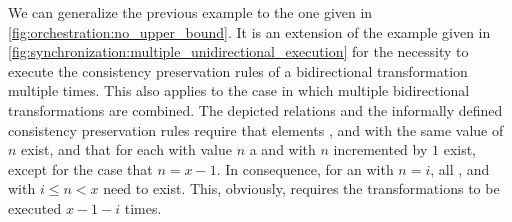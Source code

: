 We can generalize the previous example to the one given in \autoref{fig:orchestration:no_upper_bound}.
It is an extension of the example given in \autoref{fig:synchronization:multiple_unidirectional_execution} for the necessity to execute the consistency preservation rules of a bidirectional transformation multiple times.
This also applies to the case in which multiple bidirectional transformations are combined.
The depicted relations and the informally defined consistency preservation rules require that elements ,  and  with the same value of $n$ exist, and that for each  with value $n$ a  and  with $n$ incremented by $1$ exist, except for the case that $n = x-1$.
In consequence, for an  with $n = i$, all ,  and  with $i \leq n < x$ need to exist.
This, obviously, requires the transformations to be executed $x-1-i$ times.

